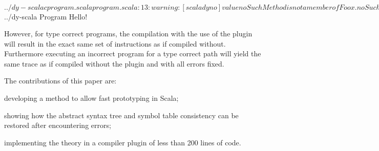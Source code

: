 \begin{lstlisting-nobreak}
$ ../dy-scalac program.scala
program.scala:13: warning: [scaladyno] value noSuchMethod is not a member of Foo
     x.noSuchMethod()
       ^
one warning found
$ ../dy-scala Program
Hello!
\end{lstlisting-nobreak}

However, for type correct programs, the compilation with the use of the plugin will result in the exact same set of instructions as if compiled without. Furthermore executing an incorrect program for a type correct path will yield the same trace as if compiled without the plugin and with all errors fixed.\linebreak

The contributions of this paper are:
\begin{packed_item}
\item developing a method to allow fast prototyping in Scala;
\item showing how the abstract syntax tree and symbol table consistency can be restored after encountering errors;
\item implementing the theory in a compiler plugin of less than 200 lines of code.
\end{packed_item}

